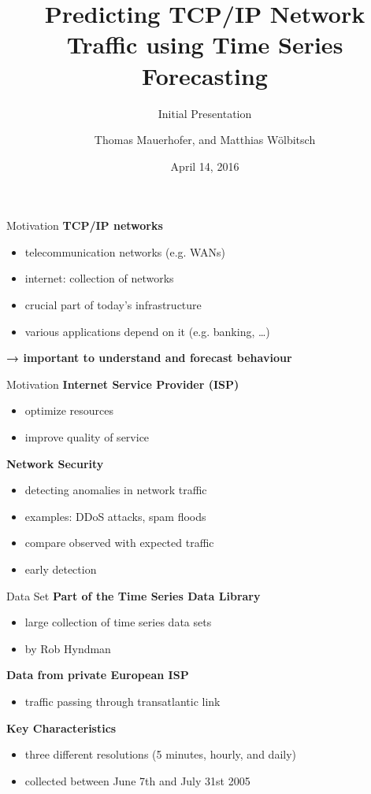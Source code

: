 \documentclass{beamer}
\title{Predicting TCP/IP Network Traffic using Time Series Forecasting}
\subtitle{Initial Presentation}
\date{April 14, 2016}
\author{Thomas Mauerhofer, and Matthias Wölbitsch}
\begin{document}
  \maketitle
  
  \begin{frame}{Motivation}   
    \textbf{TCP/IP networks} 
    \begin{itemize}
      \item telecommunication networks (e.g. WANs)
      \item internet: collection of networks 
      \item crucial part of today's infrastructure  
      \item various applications depend on it (e.g. banking, \ldots)
    \end{itemize}
    
    \hspace{10pt}
    
    \textbf{→ important to understand and forecast behaviour}
  \end{frame}
  
  \begin{frame}{Motivation}
    \textbf{Internet Service Provider (ISP)}
    \begin{itemize}
     \item optimize resources
     \item improve quality of service
    \end{itemize}
    
    \textbf{Network Security}
    \begin{itemize}
     \item detecting anomalies in network traffic
     \item examples: DDoS attacks, spam floods
     \item compare observed with expected traffic
     \item early detection
    \end{itemize}    
  \end{frame}


  \begin{frame}{Data Set}
    \textbf{Part of the Time Series Data Library}
    \begin{itemize}
     \item large collection of time series data sets
     \item by Rob Hyndman
    \end{itemize}

    \textbf{Data from private European ISP}
    \begin{itemize}
     \item traffic passing through transatlantic link
    \end{itemize}

    \textbf{Key Characteristics}
    \begin{itemize}
     \item three different resolutions (5 minutes, hourly, and daily)
     \item collected between June 7th and July 31st 2005
    \end{itemize}

  \end{frame}
\end{document}
